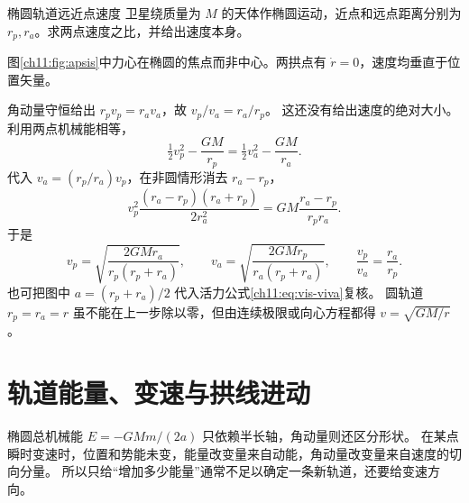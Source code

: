 \begin{origexamplebox}{椭圆轨道远近点速度}\label{ch11:ex:02}
卫星绕质量为 $M$ 的天体作椭圆运动，近点和远点距离分别为 $r_p,r_a$。求两点速度之比，并给出速度本身。

\ThQApsides
\end{origexamplebox}
\begin{xesolution}
图\ref{ch11:fig:apsis}中力心在椭圆的焦点而非中心。两拱点有 $\dot r=0$，速度均垂直于位置矢量。
\begin{center}\begin{minipage}{\linewidth}\centering
{}
\label{ch11:fig:apsis}
\end{minipage}\end{center}
角动量守恒给出 $r_pv_p=r_av_a$，故 $v_p/v_a=r_a/r_p$。
这还没有给出速度的绝对大小。利用两点机械能相等，
\[
 \tfrac12v_p^2-\frac{GM}{r_p}
 =\tfrac12v_a^2-\frac{GM}{r_a}.
\]
代入 $v_a=(r_p/r_a)v_p$，在非圆情形消去 $r_a-r_p$，
\[
 v_p^2\frac{(r_a-r_p)(r_a+r_p)}{2r_a^2}
 =GM\frac{r_a-r_p}{r_pr_a}.
\]
于是
\[
 \boxed{v_p=\sqrt{\frac{2GMr_a}{r_p(r_p+r_a)}}},\qquad
 \boxed{v_a=\sqrt{\frac{2GMr_p}{r_a(r_p+r_a)}}},\qquad
 \boxed{\frac{v_p}{v_a}=\frac{r_a}{r_p}}.
\]
也可把图中 $a=(r_p+r_a)/2$ 代入活力公式\eqref{ch11:eq:vis-viva}复核。
圆轨道 $r_p=r_a=r$ 虽不能在上一步除以零，但由连续极限或向心方程都得 $v=\sqrt{GM/r}$。
\end{xesolution}

\section{轨道能量、变速与拱线进动}
椭圆总机械能 $E=-GMm/(2a)$ 只依赖半长轴，角动量则还区分形状。
在某点瞬时变速时，位置和势能未变，能量改变量来自动能，角动量改变量来自速度的切向分量。
所以只给“增加多少能量”通常不足以确定一条新轨道，还要给变速方向。

